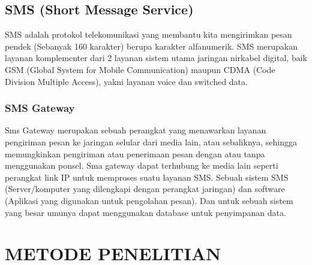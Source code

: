 \documentclass{jtetiproposalskripsi}
\begin{document}
\section{SMS (Short Message Service)}
SMS adalah protokol telekomunikasi yang membantu kita mengirimkan pesan pendek (Sebanyak 160 karakter) berupa karakter alfanumerik. SMS merupakan layanan komplementer dari 2 layanan sistem utama jaringan nirkabel digital, baik GSM (Global System for Mobile Communication) maupun CDMA (Code Division Multiple Access), yakni layanan voice dan switched data.

\subsection{SMS Gateway}
Sms Gateway merupakan sebuah perangkat yang menawarkan layanan pengiriman pesan ke jaringan selular dari media lain, atau sebaliknya, sehingga memungkinkan pengiriman atau penerimaan pesan dengan atau tanpa menggunakan ponsel. Sma gateway dapat terhubung ke media lain seperti perangkat link IP untuk memproses suatu layanan SMS. Sebuah sistem SMS (Server/komputer yang dilengkapi dengan perangkat jaringan) dan software (Aplikasi yang digunakan untuk pengolahan pesan). Dan untuk sebuah sistem yang besar umunya dapat menggunakan database untuk penyimpanan data.

\chapter{METODE PENELITIAN}
\end{document}
